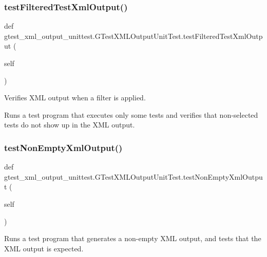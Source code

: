 \subsubsection{\texorpdfstring{testFilteredTestXmlOutput()}{testFilteredTestXmlOutput()}}
{\footnotesize\ttfamily def gtest\+\_\+xml\+\_\+output\+\_\+unittest.\+G\+Test\+X\+M\+L\+Output\+Unit\+Test.\+test\+Filtered\+Test\+Xml\+Output (\begin{DoxyParamCaption}\item[{}]{self }\end{DoxyParamCaption})}

\begin{DoxyVerb}Verifies XML output when a filter is applied.

Runs a test program that executes only some tests and verifies that
non-selected tests do not show up in the XML output.
\end{DoxyVerb}
 \mbox{\label{classgtest__xml__output__unittest_1_1_g_test_x_m_l_output_unit_test_a310c136c1eb2b421f57651a7d358b17a}} 
\subsubsection{\texorpdfstring{testNonEmptyXmlOutput()}{testNonEmptyXmlOutput()}}
{\footnotesize\ttfamily def gtest\+\_\+xml\+\_\+output\+\_\+unittest.\+G\+Test\+X\+M\+L\+Output\+Unit\+Test.\+test\+Non\+Empty\+Xml\+Output (\begin{DoxyParamCaption}\item[{}]{self }\end{DoxyParamCaption})}

\begin{DoxyVerb}Runs a test program that generates a non-empty XML output, and
tests that the XML output is expected.
\end{DoxyVerb}
 \mbox{\label{classgtest__xml__output__unittest_1_1_g_test_x_m_l_output_unit_test_adc6a611bd7c433ecd84876dcb2ac1df1}} 
